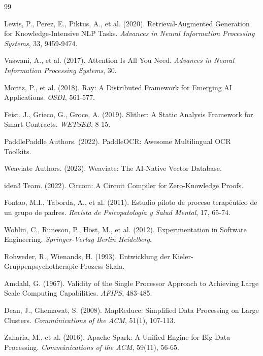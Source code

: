 \documentclass[12pt,a4paper,twoside]{book}
\begin{document}

\begin{thebibliography}{99}

Lewis, P., Perez, E., Piktus, A., et al. (2020).
Retrieval-Augmented Generation for Knowledge-Intensive NLP Tasks.
\textit{Advances in Neural Information Processing Systems}, 33, 9459-9474.

Vaswani, A., et al. (2017).
Attention Is All You Need.
\textit{Advances in Neural Information Processing Systems}, 30.

Moritz, P., et al. (2018).
Ray: A Distributed Framework for Emerging AI Applications.
\textit{OSDI}, 561-577.

Feist, J., Grieco, G., Groce, A. (2019).
Slither: A Static Analysis Framework for Smart Contracts.
\textit{WETSEB}, 8-15.

PaddlePaddle Authors. (2022).
PaddleOCR: Awesome Multilingual OCR Toolkits.

Weaviate Authors. (2023).
Weaviate: The AI-Native Vector Database.

iden3 Team. (2022).
Circom: A Circuit Compiler for Zero-Knowledge Proofs.

Fontao, M.I., Taborda, A., et al. (2011).
Estudio piloto de proceso terapéutico de un grupo de padres.
\textit{Revista de Psicopatología y Salud Mental}, 17, 65-74.

Wohlin, C., Runeson, P., Höst, M., et al. (2012).
Experimentation in Software Engineering.
\textit{Springer-Verlag Berlin Heidelberg}.

Rohweder, R., Wienands, H. (1993).
Entwicklung der Kieler-Gruppenpsychotherapie-Prozess-Skala.

Amdahl, G. (1967).
Validity of the Single Processor Approach to Achieving Large Scale Computing Capabilities.
\textit{AFIPS}, 483-485.

Dean, J., Ghemawat, S. (2008).
MapReduce: Simplified Data Processing on Large Clusters.
\textit{Commúnications of the ACM}, 51(1), 107-113.

Zaharia, M., et al. (2016).
Apache Spark: A Unified Engine for Big Data Processing.
\textit{Commúnications of the ACM}, 59(11), 56-65.


\end{thebibliography}
\end{document}
